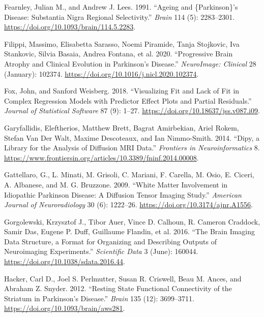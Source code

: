 \documentclass[
  table]{article}
\newlength{\cslhangindent}
\newenvironment{CSLReferences}[2] %
 {\begin{list}{}{%
  \setlength{\itemindent}{0pt}
  \setlength{\leftmargin}{0pt}
  \setlength{\parsep}{0pt}
  \ifodd #1
   \setlength{\leftmargin}{\cslhangindent}
   \setlength{\itemindent}{-1\cslhangindent}
  \fi
  \setlength{\itemsep}{#2\baselineskip}}}
 {\end{list}}
\begin{document}
\begin{CSLReferences}{1}{0}
Fearnley, Julian M., and Andrew J. Lees. 1991. {``Ageing and
\{{Parkinson}\}'s {Disease}: {Substantia} {Nigra} {Regional}
{Selectivity}.''} \emph{Brain} 114 (5): 2283--2301.
\url{https://doi.org/10.1093/brain/114.5.2283}.

Filippi, Massimo, Elisabetta Sarasso, Noemi Piramide, Tanja Stojkovic,
Iva Stankovic, Silvia Basaia, Andrea Fontana, et al. 2020.
{``Progressive Brain Atrophy and Clinical Evolution in {Parkinson}{'}s
Disease.''} \emph{NeuroImage: Clinical} 28 (January): 102374.
\url{https://doi.org/10.1016/j.nicl.2020.102374}.

Fox, John, and Sanford Weisberg. 2018. {``Visualizing Fit and Lack of
Fit in Complex Regression Models with Predictor Effect Plots and Partial
Residuals.''} \emph{Journal of Statistical Software} 87 (9): 1--27.
\url{https://doi.org/10.18637/jss.v087.i09}.

Garyfallidis, Eleftherios, Matthew Brett, Bagrat Amirbekian, Ariel
Rokem, Stefan Van Der Walt, Maxime Descoteaux, and Ian Nimmo-Smith.
2014. {``Dipy, a Library for the Analysis of Diffusion {MRI} Data.''}
\emph{Frontiers in Neuroinformatics} 8.
\url{https://www.frontiersin.org/articles/10.3389/fninf.2014.00008}.

Gattellaro, G., L. Minati, M. Grisoli, C. Mariani, F. Carella, M. Osio,
E. Ciceri, A. Albanese, and M. G. Bruzzone. 2009. {``White {Matter}
{Involvement} in {Idiopathic} {Parkinson} {Disease}: {A} {Diffusion}
{Tensor} {Imaging} {Study}.''} \emph{American Journal of Neuroradiology}
30 (6): 1222--26. \url{https://doi.org/10.3174/ajnr.A1556}.

Gorgolewski, Krzysztof J., Tibor Auer, Vince D. Calhoun, R. Cameron
Craddock, Samir Das, Eugene P. Duff, Guillaume Flandin, et al. 2016.
{``The Brain Imaging Data Structure, a Format for Organizing and
Describing Outputs of Neuroimaging Experiments.''} \emph{Scientific
Data} 3 (June): 160044. \url{https://doi.org/10.1038/sdata.2016.44}.

Hacker, Carl D., Joel S. Perlmutter, Susan R. Criswell, Beau M. Ances,
and Abraham Z. Snyder. 2012. {``Resting State Functional Connectivity of
the Striatum in {Parkinson}{'}s Disease.''} \emph{Brain} 135 (12):
3699--3711. \url{https://doi.org/10.1093/brain/aws281}.


\end{CSLReferences}
\end{document}

